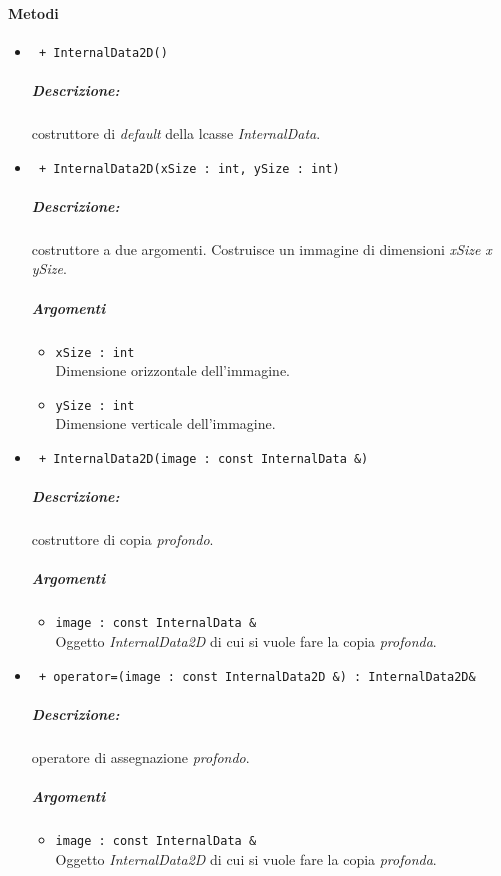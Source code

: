 \paragraph{Metodi}
	\begin{itemize}
		\item \color{blue}\verb! + InternalData2D()! \\
		\color{black}
		\subparagraph{Descrizione:} costruttore di \emph{default} della lcasse \textsl{InternalData}.
		
		\item \color{blue}\verb! + InternalData2D(xSize : int, ySize : int)! \\
		\color{black}
		\subparagraph{Descrizione:} costruttore a due argomenti. Costruisce un immagine di dimensioni \textit{xSize x ySize}. 
		\subparagraph{Argomenti}
			\begin{itemize}
				\item \color{RoyalPurple}\verb!xSize : int! \\ 
				\color{black}Dimensione orizzontale dell'immagine.
				
				\item \color{RoyalPurple}\verb!ySize : int! \\ 
				\color{black}Dimensione verticale dell'immagine.
			\end{itemize}
		
		\item \color{blue}\verb! + InternalData2D(image : const InternalData &)!\\
		\color{black}
		\subparagraph{Descrizione:} costruttore di copia \emph{profondo}.
		\subparagraph{Argomenti}
			\begin{itemize}
				\item \color{RoyalPurple}\verb!image : const InternalData &!\\
				\color{black}Oggetto \textsl{InternalData2D} di cui si vuole fare la copia \emph{profonda}.
			\end{itemize}
		
		\item \color{blue}\verb! + operator=(image : const InternalData2D &) : InternalData2D&!\\
		\color{black}
		\subparagraph{Descrizione:} operatore di assegnazione \emph{profondo}.
		\subparagraph{Argomenti}
			\begin{itemize}
				\item \color{RoyalPurple}\verb!image : const InternalData &!\\
				\color{black}Oggetto \textsl{InternalData2D} di cui si vuole fare la copia \emph{profonda}.
			\end{itemize}
		

\end{itemize}
